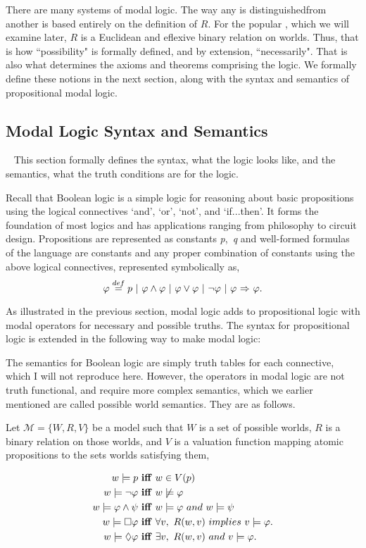 There are many systems of modal logic. The way any is distinguishedfrom  another is based entirely on the definition of $R$. For the popular \SFive, which we will examine later, $R$ is a Euclidean and eflexive binary relation on worlds. Thus, that is how ``possibility" is formally defined, and by extension, ``necessarily". That is also what determines the axioms and theorems comprising the logic. We formally define these notions in the next section, along with the syntax and semantics of propositional modal logic.

\subsection{Modal Logic Syntax and Semantics}~\label{sec:molo_syn_sem}
This section formally defines the syntax, what the logic looks like, and the semantics, what the truth conditions are for the logic.

Recall that Boolean logic is a simple logic for reasoning about basic propositions using the logical connectives `and', `or', `not', and `if...then'. It forms the foundation of most logics and has applications ranging from philosophy to circuit design. Propositions are represented as constants {\emph p,\ \emph q} and well-formed formulas of the language are constants and any proper combination of constants using the above logical connectives, represented symbolically as,
$$\varphi \stackrel{def}{=} p\  |\  \varphi \wedge \varphi\  |\  \varphi \vee \varphi\  |\ \neg \varphi \ |\   \varphi {\ \Rightarrow \ } \varphi. 
$$

As illustrated in the previous section, modal logic adds to propositional logic with modal operators for necessary and possible truths. The syntax for propositional logic is extended in the following way to make modal logic:


The semantics for Boolean logic are simply truth tables for each connective, which I will not reproduce here. However, the operators in modal logic are not truth functional, and require more complex semantics, which we earlier mentioned are called possible world semantics. They are as follows.

Let $\mathcal{M} = \{W, R, V\}$ be a model such that $W$ is a set of possible worlds, $R$ is a binary relation on those worlds, and $V$ is a valuation function mapping atomic propositions to the sets worlds satisfying them,  

\begin{align*}
w \models p\  &\mathbf{iff}\ w \in V(p) \\
w \models \neg \varphi\  &\mathbf{iff}\  w\not\models \varphi  \\
w \models \varphi \wedge \psi\ &\mathbf{iff}\ w\models \varphi\ \mathnormal{and}\ w\models \psi \\
w \models \Box \varphi\  &\mathbf{iff}\ \forall v,\ R(w,v)\  \mathnormal{implies}\ v \models \varphi. \\
w \models \Diamond \varphi\ &\mathbf{iff}\ \exists v,\ R(w,v)\ \mathnormal{and}\ v\models \varphi.
\end{align*}

